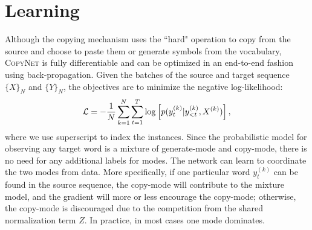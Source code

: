 \section{Learning} 	\vspace{-5pt}
Although the copying mechanism uses the ``hard" operation to copy from the source and choose to paste them or generate symbols from the vocabulary, \textsc{CopyNet} is fully differentiable and can be optimized in an end-to-end fashion using back-propagation. Given the batches of the source and target sequence $\{X\}_N$ and $\{Y\}_N$, the objectives are to minimize the negative log-likelihood:
	\vspace{-9pt}\begin{equation}
      \hspace{-0.5pt} \mathcal{L} = -\frac{1}{N}\sum_{k=1}^N\sum_{t=1}^{T}\log \left[ p(y^{(k)}_t|y^{(k)}_{<t}, X^{(k)})\right], 	\vspace{-9pt}
\end{equation}
where we use superscript to index the instances. Since the probabilistic model for observing any target word is a mixture of generate-mode and copy-mode, there is no need for any additional labels for modes. The network can learn to coordinate the two modes from data. More specifically, if one particular word $y_{t}^{(k)}$ can be found in the source sequence, the copy-mode will contribute to the mixture model, and the gradient will more or less encourage the copy-mode; otherwise, the copy-mode is discouraged due to the competition from the shared normalization term $Z$. In practice, in most cases one mode dominates.
